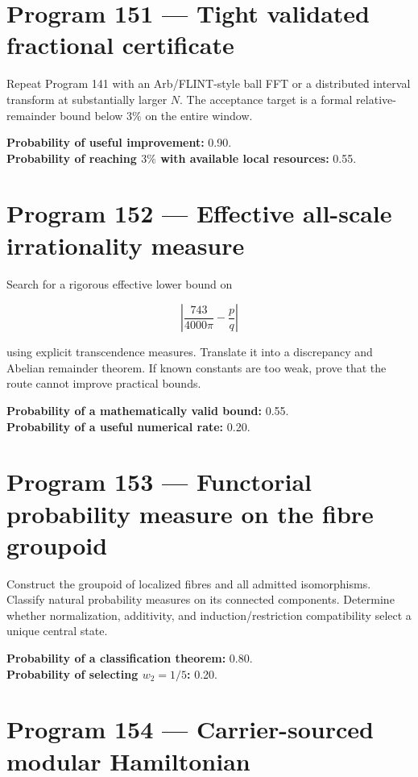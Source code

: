 \documentclass[11pt,a4paper,openany]{report}
\begin{document}
\section{Program 151 --- Tight validated fractional certificate}

Repeat Program 141 with an Arb/\allowbreak{}FLINT-style ball FFT or a distributed interval transform at substantially larger \(N\). The acceptance target is a formal relative-remainder bound below \(3\%\) on the entire window.

\textbf{Probability of useful improvement:} 0.90.\\
\textbf{Probability of reaching \(3\%\) with available local resources:} 0.55.

\section{Program 152 --- Effective all-scale irrationality measure}

Search for a rigorous effective lower bound on

\[
\left|
\frac{743}{4000\pi}-\frac pq
\right|
\]

using explicit transcendence measures. Translate it into a discrepancy and Abelian remainder theorem. If known constants are too weak, prove that the route cannot improve practical bounds.

\textbf{Probability of a mathematically valid bound:} 0.55.\\
\textbf{Probability of a useful numerical rate:} 0.20.

\section{Program 153 --- Functorial probability measure on the fibre groupoid}

Construct the groupoid of localized fibres and all admitted isomorphisms. Classify natural probability measures on its connected components. Determine whether normalization, additivity, and induction/\allowbreak{}restriction compatibility select a unique central state.

\textbf{Probability of a classification theorem:} 0.80.\\
\textbf{Probability of selecting \(w_2=1/5\):} 0.20.

\section{Program 154 --- Carrier-sourced modular Hamiltonian}
\end{document}

